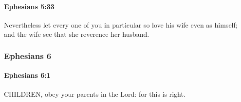 		\paragraph{Ephesians 5:33} %
			\label{EPHESIANS-5-33}

			Nevertheless let every one of you in particular so love his wife even as himself; and the wife see that she reverence her husband.

			\begin{framed}
			\scriptsize
				\begin{compactdesc}
					\item[SBLG] 
				\end{compactdesc}
			\end{framed}

	\subsubsection{Ephesians 6} %
		\label{EPHESIANS-6}
		
		\paragraph{Ephesians 6:1} %
			\label{EPHESIANS-6-1}

			CHILDREN, obey your parents in the Lord: for this is right.

